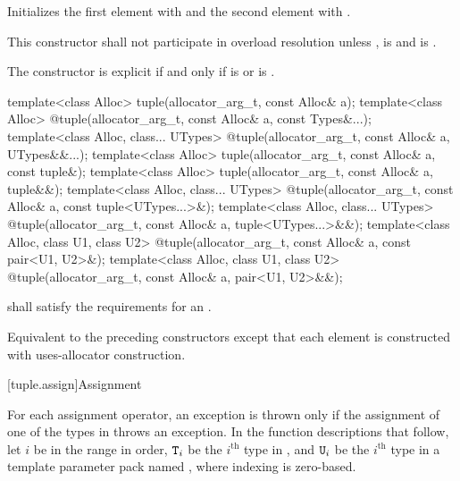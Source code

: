 \begin{itemdescr}
\pnum
\effects Initializes the first element with
 and the
second element with .

\pnum
\remarks This constructor shall not participate in overload resolution unless
,
 is  and
 is .

\pnum
The constructor is explicit if and only if
 is  or
 is .
\end{itemdescr}

%
\begin{itemdecl}
template<class Alloc>
  tuple(allocator_arg_t, const Alloc& a);
template<class Alloc>
  @\EXPLICIT@ tuple(allocator_arg_t, const Alloc& a, const Types&...);
template<class Alloc, class... UTypes>
  @\EXPLICIT@ tuple(allocator_arg_t, const Alloc& a, UTypes&&...);
template<class Alloc>
  tuple(allocator_arg_t, const Alloc& a, const tuple&);
template<class Alloc>
  tuple(allocator_arg_t, const Alloc& a, tuple&&);
template<class Alloc, class... UTypes>
  @\EXPLICIT@ tuple(allocator_arg_t, const Alloc& a, const tuple<UTypes...>&);
template<class Alloc, class... UTypes>
  @\EXPLICIT@ tuple(allocator_arg_t, const Alloc& a, tuple<UTypes...>&&);
template<class Alloc, class U1, class U2>
  @\EXPLICIT@ tuple(allocator_arg_t, const Alloc& a, const pair<U1, U2>&);
template<class Alloc, class U1, class U2>
  @\EXPLICIT@ tuple(allocator_arg_t, const Alloc& a, pair<U1, U2>&&);
\end{itemdecl}

\begin{itemdescr}
\pnum
\requires {} shall satisfy the requirements for an
.

\pnum
\effects Equivalent to the preceding constructors except that each element is constructed with
uses-allocator construction.
\end{itemdescr}

[tuple.assign]{Assignment}

\pnum
For each  assignment operator, an exception is thrown only if the
assignment of one of the types in  throws an exception.
In the function descriptions that follow, let $i$ be in the range 
in order, $\texttt{T}_i$ be the $i^\text{th}$ type in ,
and $\texttt{U}_i$ be the $i^\text{th}$ type in a
template parameter pack named , where indexing is zero-based.

